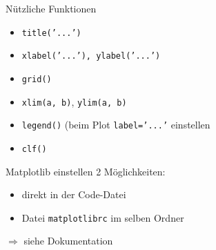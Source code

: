 \begin{frame}{Nützliche Funktionen}
  \begin{itemize}
    \item \texttt{title('...')}
    \item \texttt{xlabel('...'), ylabel('...')}
    \item \texttt{grid()}
    \item \texttt{xlim(a, b)}, \texttt{ylim(a, b)}
    \item \texttt{legend()} (beim Plot \texttt{label='...'} einstellen
    \item \texttt{clf()}
  \end{itemize}
\end{frame}

\begin{frame}{Matplotlib einstellen}
  2 Möglichkeiten:
  \begin{itemize}
    \item direkt in der Code-Datei
    \item Datei \texttt{matplotlibrc} im selben Ordner
  \end{itemize}
  $\Rightarrow$ siehe Dokumentation
\end{frame}
